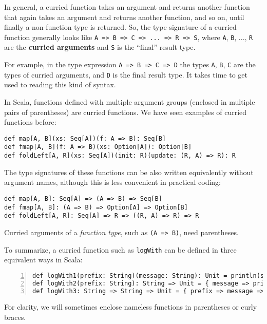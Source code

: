 In general, a curried function takes an argument and returns another
function that again takes an argument and returns another function,
and so on, until finally a non-function type is returned. So, the
type signature of a curried function generally looks like \lstinline!A => B => C => ... => R => S!,
where \lstinline!A!, \lstinline!B!, ..., \lstinline!R! are the
\textbf{curried arguments} and \lstinline!S!
is the \textsf{``}final\textsf{''} result type.

For example, in the type expression \lstinline!A => B => C => D!
the types \lstinline!A!, \lstinline!B!, \lstinline!C! are the types
of curried arguments, and \lstinline!D! is the final result type.
It takes time to get used to reading this kind of syntax.

In Scala, functions defined with multiple argument groups (enclosed
in multiple pairs of parentheses) are curried functions. We have seen
examples of curried functions before:
\begin{lstlisting}
def map[A, B](xs: Seq[A])(f: A => B): Seq[B]
def fmap[A, B](f: A => B)(xs: Option[A]): Option[B]
def foldLeft[A, R](xs: Seq[A])(init: R)(update: (R, A) => R): R
\end{lstlisting}
The type signatures of these functions can be also written equivalently
without argument names, although this is less convenient in practical
coding:
\begin{lstlisting}
def map[A, B]: Seq[A] => (A => B) => Seq[B]
def fmap[A, B]: (A => B) => Option[A] => Option[B]
def foldLeft[A, R]: Seq[A] => R => ((R, A) => R) => R
\end{lstlisting}
Curried arguments of a \emph{function type}, such as \lstinline!(A => B)!,
need parentheses.

To summarize, a curried function such as \lstinline!logWith! can
be defined in three equivalent ways in Scala:
\begin{lstlisting}[numbers=left]
def logWith1(prefix: String)(message: String): Unit = println(s"$prefix: $message")
def logWith2(prefix: String): String => Unit = { message => println(s"$prefix: $message") }
def logWith3: String => String => Unit = { prefix => message => println(s"$prefix: $message") }
\end{lstlisting}
For clarity, we will sometimes enclose nameless functions in parentheses
or curly braces. 


